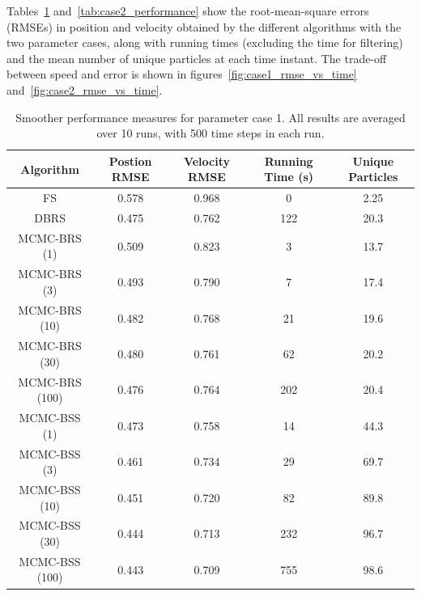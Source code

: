 \documentclass[journal]{IEEEtran}
\begin{document}
Tables~\ref{tab:case1_performance} and~\ref{tab:case2_performance} show the root-mean-square errors (RMSEs) in position and velocity obtained by the different algorithms with the two parameter cases, along with running times (excluding the time for filtering) and the mean number of unique particles at each time instant. The trade-off between speed and error is shown in figures~\ref{fig:case1_rmse_vs_time} and~\ref{fig:case2_rmse_vs_time}.

\begin{table}[!t]%
\renewcommand{\arraystretch}{1.3}
\caption{Smoother performance measures for parameter case 1. All results are averaged over 10 runs, with 500 time steps in each run.}
\label{tab:case1_performance}
\centering
\begin{tabular}{|c||c|c|c|c|}
\hline
Algorithm & \begin{minipage}[c]{1cm} Postion RMSE \end{minipage} & \begin{minipage}[c]{1cm}  Velocity RMSE \end{minipage} & \begin{minipage}[c]{1cm}  Running Time (s) \end{minipage} & \begin{minipage}[c]{1cm}  Unique Particles \end{minipage} \\
\hline
FS 						& 0.578 & 0.968 & 0 & 2.25 \\
DBRS					& 0.475 & 0.762 & 122 & 20.3 \\
\hline
MCMC-BRS (1)	& 0.509 & 0.823 & 3 & 13.7 \\
MCMC-BRS (3)	& 0.493 & 0.790 & 7 & 17.4 \\
MCMC-BRS (10)	& 0.482 & 0.768 & 21 & 19.6 \\
MCMC-BRS (30)	& 0.480 & 0.761 & 62 & 20.2 \\
MCMC-BRS (100)& 0.476 & 0.764 & 202 & 20.4 \\
\hline
MCMC-BSS (1)	& 0.473 & 0.758 & 14 & 44.3 \\
MCMC-BSS (3)	& 0.461 & 0.734 & 29 & 69.7 \\
MCMC-BSS (10)	& 0.451 & 0.720 & 82 & 89.8 \\
MCMC-BSS (30)	& 0.444 & 0.713 & 232 & 96.7 \\
MCMC-BSS (100)& 0.443 & 0.709 & 755 & 98.6 \\
\hline
\end{tabular}
\end{table}
\end{document}
